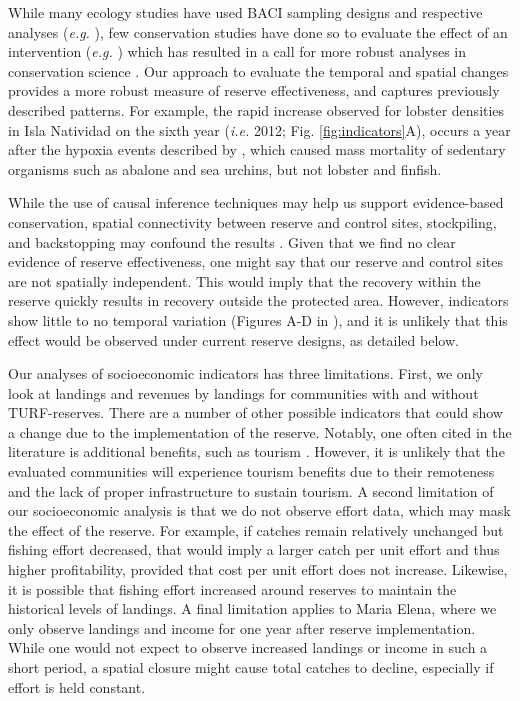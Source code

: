 \documentclass[10pt,letterpaper]{article}
\begin{document}
While many ecology studies have used BACI sampling designs and respective analyses (\emph{e.g.} \cite{stewartoaten_1986}), few conservation studies have done so to evaluate the effect of an intervention (\emph{e.g.} \cite{francinifilho_2008,lester_2009,moland_2013,kerr_2019}) which has resulted in a call for more robust analyses in conservation science \cite{guidetti_2002,ferraro_2006}. Our approach to evaluate the temporal and spatial changes provides a more robust measure of reserve effectiveness, and captures previously described patterns. For example, the rapid increase observed for lobster densities in Isla Natividad on the sixth year (\emph{i.e.} 2012; Fig. \ref{fig:indicators}A), occurs a year after the hypoxia events described by \cite{micheli_2012-EU}, which caused mass mortality of sedentary organisms such as abalone and sea urchins, but not lobster and finfish.

While the use of causal inference techniques may help us support evidence-based conservation, spatial connectivity between reserve and control sites, stockpiling, and backstopping may confound the results \cite{kerr_2019}. Given that we find no clear evidence of reserve effectiveness, one might say that our reserve and control sites are not spatially independent. This would imply that the recovery within the reserve quickly results in recovery outside the protected area. However, indicators show little to no temporal variation (Figures A-D in ), and it is unlikely that this effect would be observed under current reserve designs, as detailed below.

Our analyses of socioeconomic indicators has three limitations. First, we only look at landings and revenues by landings for communities with and without TURF-reserves. There are a number of other possible indicators that could show a change due to the implementation of the reserve. Notably, one often cited in the literature is additional benefits, such as tourism \cite{viana_2017}. However, it is unlikely that the evaluated communities will experience tourism benefits due to their remoteness and the lack of proper infrastructure to sustain tourism. A second limitation of our socioeconomic analysis is that we do not observe effort data, which may mask the effect of the reserve. For example, if catches remain relatively unchanged but fishing effort decreased, that would imply a larger catch per unit effort and thus higher profitability, provided that cost per unit effort does not increase. Likewise, it is possible that fishing effort increased around reserves to maintain the historical levels of landings. A final limitation applies to Maria Elena, where we only observe landings and income for one year after reserve implementation. While one would not expect to observe increased landings or income in such a short period, a spatial closure might cause total catches to decline, especially if effort is held constant.
\end{document}
